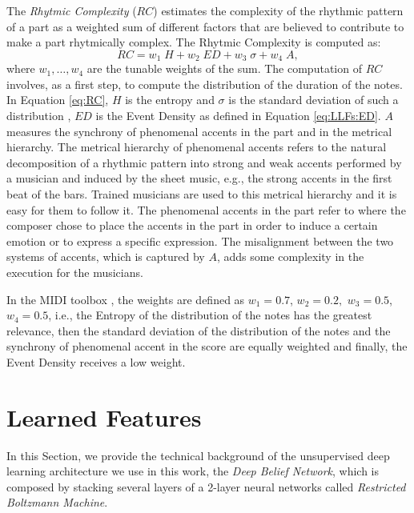 The \textit{Rhytmic Complexity} ($RC$) \cite{povel} estimates the complexity of the rhythmic pattern of a part as a weighted sum of different factors that are believed to contribute to make a part rhytmically complex. The Rhytmic Complexity is computed as: 
\begin{equation}\label{eq:RC}
RC= w_1 \; H + w_2 \; ED + w_3 \; \sigma + w_4 \; A,
\end{equation}
where $w_1, \ldots, w_4$ are the tunable weights of the sum. 
The computation of $RC$ involves, as a first step, to compute the distribution of the duration of the notes. In Equation \ref{eq:RC}, $H$ is the entropy and $\sigma$ is the standard deviation of such a distribution \cite{eerola2003}, $ED$ is the Event Density as defined in Equation \ref{eq:LLFs:ED}. $A$ measures the synchrony of phenomenal accents in the part and in the metrical hierarchy. The metrical hierarchy of phenomenal accents refers to the natural decomposition of a rhythmic pattern into strong and weak accents performed by a musician and induced by the sheet music, e.g., the strong accents in the first beat of the bars. Trained musicians are used to this metrical hierarchy and it is easy for them to follow it. The phenomenal accents in the part refer to where the composer chose to place the accents in the part in order to induce a certain emotion or to express a specific expression. The misalignment between the two systems of accents, which is captured by $A$, adds some complexity in the execution for the musicians. 

In the MIDI toolbox \cite{Eerola2004}, the weights are defined as $w_1= 0.7$, $w_2=0.2,$  $w_3=0.5$, $w_4=0.5$, i.e., the Entropy of the distribution of the notes has the greatest relevance, then the standard deviation of the distribution of the notes and the synchrony of phenomenal accent in the score are equally weighted and finally, the Event Density receives a low weight. 
%
\section{Learned Features}\label{sec:app:learned}
In this Section, we provide the technical background of the unsupervised deep learning architecture we use in this work, the \textit{Deep Belief Network}, which is composed by stacking several layers of a 2-layer neural networks called \textit{Restricted Boltzmann Machine}. 

